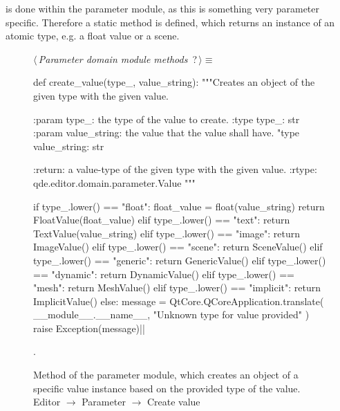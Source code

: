 \documentclass[%
    a4paper,    %
    justified,  %
    nobib,      %
    openany     %
]{tufte-book}
\begin{document}
 is done within the
parameter module, as this is something very parameter specific. Therefore a
static method is defined, which returns an instance of an atomic type, e.g. a
float value or a scene. 

\begin{figure}
\begin{flushleft} \small
\begin{minipage}{\linewidth}\label{scrap129}\raggedright\small
{} $\langle\,${\itshape Parameter domain module methods}\nobreak\ {\footnotesize {?}}$\,\rangle\equiv$
\vspace{-1ex}
\begin{pythoncode}
def create_value(type_, value_string):
    """Creates an object of the given type with the given value.

    :param type_: the type of the value to create.
    :type  type_: str
    :param value_string: the value that the value shall have.
    "type  value_string: str

    :return: a value-type of the given type with the given value.
    :rtype: qde.editor.domain.parameter.Value
    """

    if type_.lower() == "float":
        float_value = float(value_string)
        return FloatValue(float_value)
    elif type_.lower() == "text":
        return TextValue(value_string)
    elif type_.lower() == "image":
        return ImageValue()
    elif type_.lower() == "scene":
        return SceneValue()
    elif type_.lower() == "generic":
        return GenericValue()
    elif type_.lower() == "dynamic":
        return DynamicValue()
    elif type_.lower() == "mesh":
        return MeshValue()
    elif type_.lower() == "implicit":
        return ImplicitValue()
    else:
        message = QtCore.QCoreApplication.translate(
            __module__.__name__, "Unknown type for value provided"
        )
        raise Exception(message)|\NWsep|
\end{pythoncode}
\vspace{1.5ex}
\footnotesize
\begin{list}{}{\setlength{\itemsep}{-\parsep}\setlength{\itemindent}{-\leftmargin}}
\item {\NWtxtMacroNoRef}.

\item{}
\end{list}
\end{minipage}\vspace{4ex}
\end{flushleft}
\caption{Method of the parameter module, which creates an object of a specific
  value instance based on the provided type of the value.
  \newline{}\newline{}Editor $\rightarrow$ Parameter $\rightarrow$
  Create value}
\label{editor:lst:parameter:create-value}
\end{figure}
\end{document}
